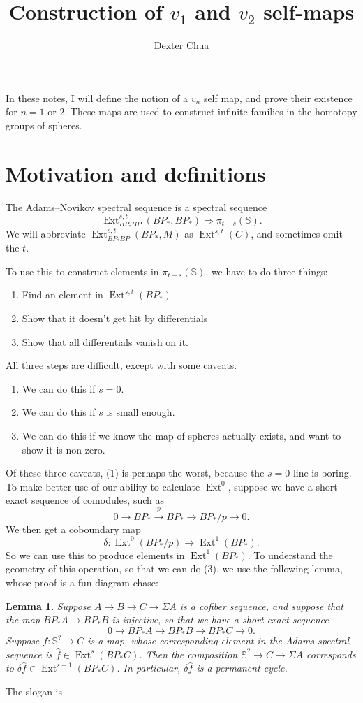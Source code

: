 \documentclass{shortart}
\title{Construction of \texorpdfstring{$v_1$}{v1} and \texorpdfstring{$v_2$}{v2} self-maps}
\author{Dexter Chua}
\newtheorem*{lemma}{Lemma}
\theoremstyle{definition}
\newcommand\Sph{\mathbb{S}}
\DeclareMathOperator\Ext{Ext}
\begin{document}
\ifplastex\else\vspace{10pt}\fi
In these notes, I will define the notion of a $v_n$ self map, and prove their existence for $n = 1$ or $2$. These maps are used to construct infinite families in the homotopy groups of spheres.

\section{Motivation and definitions}
The Adams--Novikov spectral sequence is a spectral sequence
\[
  \Ext^{s, t}_{BP_*BP}(BP_*, BP_*) \Rightarrow \pi_{t - s}(\Sph).
\]
We will abbreviate $\Ext^{s, t}_{BP_*BP}(BP_*, M)$ as $\Ext^{s, t}(C)$, and sometimes omit the $t$.

To use this to construct elements in $\pi_{t - s}(\Sph)$, we have to do three things:
\begin{enumerate}
  \item Find an element in $\Ext^{s, t}(BP_*)$
  \item Show that it doesn't get hit by differentials
  \item Show that all differentials vanish on it.
\end{enumerate}
All three steps are difficult, except with some caveats.
\begin{enumerate}
  \item We can do this if $s = 0$.
  \item We can do this if $s$ is small enough.
  \item We can do this if we know the map of spheres actually exists, and want to show it is non-zero.
\end{enumerate}

Of these three caveats, (1) is perhaps the worst, because the $s = 0$ line is boring. To make better use of our ability to calculate $\Ext^0$, suppose we have a short exact sequence of comodules, such as
\[
  0 \longrightarrow BP_* \overset{p}{\longrightarrow} BP_* \longrightarrow BP_*/p \longrightarrow 0.
\]
We then get a coboundary map
\[
  \delta : \Ext^0(BP_*/p) \to \Ext^1 (BP_*).
\]
So we can use this to produce elements in $\Ext^1(BP_*)$. To understand the geometry of this operation, so that we can do (3), we use the following lemma, whose proof is a fun diagram chase:
\begin{lemma}
  Suppose $A \to B \to C \to \Sigma A$ is a cofiber sequence, and suppose that the map $BP_* A \to BP_*B$ is injective, so that we have a short exact sequence
  \[
    0 \to BP_* A \to BP_* B \to BP_* C \to 0.
  \]
  Suppose $f: \Sph^? \to C$ is a map, whose corresponding element in the Adams spectral sequence is $\hat{f} \in \Ext^s (BP_*C)$. Then the composition $\Sph^? \to C \to \Sigma A$ corresponds to $\delta \hat{f} \in \Ext^{s + 1} (BP_* C)$. In particular, $\delta \hat{f}$ is a permanent cycle.\fakeqed
\end{lemma}
The slogan is
\end{document}
